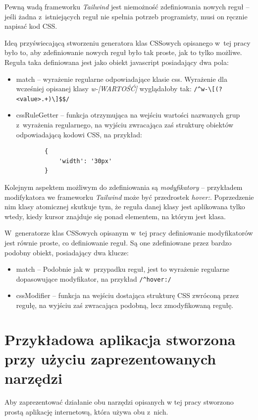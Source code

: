 \documentclass{SGGW-thesis}
\begin{document}
Pewną wadą frameworku \emph{Tailwind} jest niemożność zdefiniowania nowych reguł -- jeśli żadna z~istniejących reguł nie spełnia potrzeb programisty, musi on ręcznie napisać kod CSS.

Ideą przyświecającą stworzeniu generatora klas CSSowych opisanego w~tej pracy było to, aby zdefiniowanie nowych reguł było tak proste, jak to tylko możliwe. Reguła taka definiowana jest jako obiekt javascript posiadający dwa pola:
\begin{itemize}
    \item match -- wyrażenie regularne odpowiadające klasie css. Wyrażenie dla wcześniej opisanej klasy \emph{w-[WARTOŚĆ]} wyglądałoby tak: \verb|/^w-\[(?<value>.+)\]$$/|
    \item cssRuleGetter -- funkcja otrzymująca na wejściu wartości nazwanych grup z~wyrażenia regularnego, na wyjściu zwracająca zaś strukturę obiektów odpowiadającą kodowi CSS, na przykład:
    \begin{verbatim}
        {
            'width': '30px'
        }
    \end{verbatim}
\end{itemize}

Kolejnym aspektem możliwym do zdefiniowania są \emph{modyfikatory} -- przykładem modifykatora we frameworku \emph{Tailwind} może być przedrostek \emph{hover:}. Poprzedzenie nim klasy atomicznej skutkuje tym, że reguła danej klasy jest aplikowana tylko wtedy, kiedy kursor znajduje się ponad elementem, na którym jest klasa.

W~generatorze klas CSSowych opisanym w~tej pracy definiowanie modyfikatorów jest równie proste, co definiowanie reguł. Są one zdefiniowane przez bardzo podobny obiekt, posiadający dwa klucze:
\begin{itemize}
    \item match -- Podobnie jak w~przypadku reguł, jest to wyrażenie regularne dopasowujące modyfikator, na przykład \verb|/^hover:/|
    \item cssModifier -- funkcja na wejściu dostająca strukturę CSS zwróconą przez regułę, na wyjściu zaś zwracająca podobną, lecz zmodyfikowaną regułę.
\end{itemize}


\chapter{Przykładowa aplikacja stworzona przy użyciu zaprezentowanych narzędzi}
Aby zaprezentować działanie obu narzędzi opisanych w tej pracy stworzono prostą aplikację internetową, która używa obu z~nich.
\end{document}
